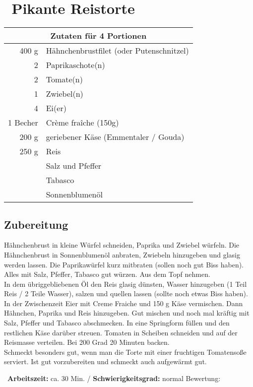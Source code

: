 \section[Pikante Reistorte]{\leafright\, Pikante Reistorte \leafleft}
\begin{minipage}[t]{0.33\textwidth}
\vspace{0pt}
\vspace{0.5cm}

\begin{tabular}{r p{3.6cm} }
\multicolumn{2}{c}{\textbf{Zutaten für 4 Portionen }}\\ \toprule
400 g& Hähnchenbrustfilet (oder Putenschnitzel)\\ \midrule
2 &	 Paprikaschote(n)\\ \midrule
2 &	 Tomate(n)\\ \midrule
1 &	 Zwiebel(n)\\ \midrule
4 &	 Ei(er)\\ \midrule
1 Becher& Crème fraîche (150g)\\ \midrule
200 g&	 geriebener Käse (Emmentaler / Gouda)\\ \midrule
250 g&	 Reis\\ \midrule
 	& Salz und Pfeffer\\ \midrule
 	& Tabasco\\ \midrule
 	& Sonnenblumenöl\\ \bottomrule
\end{tabular}

\end{minipage}
\hfill
\begin{minipage}[t]{0.60\textwidth}
\vspace{0pt}
\subsection*{Zubereitung}
Hähnchenbrust in kleine Würfel schneiden, Paprika und Zwiebel würfeln. Die Hähnchenbrust in Sonnenblumenöl anbraten, Zwiebeln hinzugeben und glasig werden lassen. Die Paprikawürfel kurz mitbraten (sollen noch gut Biss haben). Alles mit Salz, Pfeffer, Tabasco gut würzen. Aus dem Topf nehmen.\\

In dem übriggebliebenen Öl den Reis glasig dünsten, Wasser hinzugeben (1 Teil Reis / 2 Teile Wasser), salzen und quellen lassen (sollte noch etwas Biss haben).\\

In der Zwischenzeit Eier mit Creme Fraiche und 150 g Käse vermischen. Dann Hähnchen, Paprika und Reis hinzugeben. Gut mischen und noch mal kräftig mit Salz, Pfeffer und Tabasco abschmecken. In eine Springform füllen und den restlichen Käse darüber streuen. Tomaten in Scheiben schneiden und auf der Reismasse verteilen. Bei 200 Grad 20 Minuten backen.\\

Schmeckt besonders gut, wenn man die Torte mit einer fruchtigen Tomatensoße serviert. Ist gut vorzubereiten und schmeckt auch aufgewärmt gut.
\end{minipage}
\vfill
\decothreeright \, \textbf{Arbeitszeit:} ca. 30 Min. / \textbf{Schwierigkeitsgrad:} normal \decothreeleft \hfill Bewertung: \CIRCLE \LEFTcircle  \Circle  \Circle \Circle